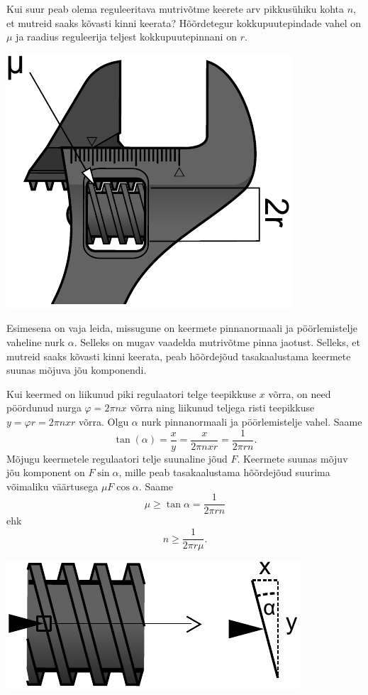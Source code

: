 
Kui suur peab olema reguleeritava mutrivõtme keerete arv pikkusühiku kohta $n$, et mutreid saaks kõvasti kinni keerata? Hõõrdetegur kokkupuutepindade vahel on $\mu$ ja raadius reguleerija teljest kokkupuutepinnani on $r$.
\begin{center}%
\includegraphics[width=0.4\linewidth]{2015-lahg-09-mutriv6ti_joonis}%
\end{center}

\hint
Esimesena on vaja leida, missugune on keermete pinnanormaali ja pöörlemistelje vaheline nurk $\alpha$. Selleks on mugav vaadelda mutrivõtme pinna jaotust. Selleks, et mutreid saaks kõvasti kinni keerata, peab hõõrdejõud tasakaalustama keermete suunas mõjuva jõu komponendi.

\solu
Kui keermed on liikunud piki regulaatori telge teepikkuse $x$ võrra, on need pöördunud nurga $\varphi=2\pi nx$ võrra ning liikunud teljega risti teepikkuse $y=\varphi r=2\pi nxr$ võrra. Olgu $\alpha$ nurk pinnanormaali ja pöörlemistelje vahel. Saame 
\[
\tan(\alpha)=\frac{x}{y}=\frac{x}{2\pi nxr}=\frac{1}{2\pi rn}.
\]
Mõjugu keermetele regulaatori telje suunaline jõud $F$. Keermete suunas mõjuv jõu komponent on $F\sin\alpha$, mille peab tasakaalustama hõõrdejõud suurima võimaliku väärtusega $\mu F\cos\alpha$. Saame 
\[
\mu\geq\tan\alpha=\frac{1}{2\pi rn}
\]
ehk
\[
n\ge\frac{1}{2\pi r\mu}.
\]

\begin{center}
\includegraphics[width=0.5\linewidth]{2015-lahg-09-mutriv6ti_lahendus.pdf}
\end{center}


